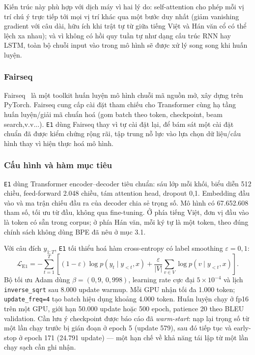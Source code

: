 Kiến trúc này phù hợp với dịch máy vì hai lý do: self-attention cho phép mỗi vị trí chú
ý trực tiếp tới mọi vị trí khác qua một bước duy nhất (giảm vanishing gradient với câu
dài, hữu ích khi trật tự từ giữa tiếng Việt và Hán văn cổ có thể lệch xa nhau); và vì
không có hồi quy tuần tự như dạng cấu trúc RNN hay LSTM, toàn bộ chuỗi input vào trong mô hình sẽ được xử lý song song khi huấn luyện.

\subsubsection{Fairseq}

Fairseq~\cite{ott2019fairseq} là một toolkit huấn luyện mô hình chuỗi mã nguồn mở, xây
dựng trên PyTorch. Fairseq cung cấp cài đặt tham chiếu cho Transformer cùng hạ tầng huấn
luyện/giải mã chuẩn hoá (gom batch theo token, checkpoint, beam search,v.v...). \texttt{E1}
dùng Fairseq thay vì tự cài đặt lại, để bám sát một cài đặt chuẩn đã được kiểm chứng rộng
rãi, tập trung nỗ lực vào lựa chọn dữ liệu/cấu hình thay vì hiện thực hoá mô hình.

\subsubsection{Cấu hình và hàm mục tiêu}

\texttt{E1} dùng Transformer encoder--decoder tiêu chuẩn: sáu lớp mỗi khối, biểu diễn
512 chiều, feed-forward 2.048 chiều, tám attention head, dropout 0,1. Embedding đầu vào
và ma trận chiếu đầu ra của decoder chia sẻ trọng số. Mô hình có 67.652.608 tham số, tối
ưu từ đầu, không qua fine-tuning. Ở phía tiếng Việt, đơn vị đầu vào là token có sẵn trong
corpus; ở phía Hán văn, mỗi ký tự là một token, theo đúng chính sách không dùng BPE đã
nêu ở mục 3.1.

Với câu đích $y_{1:T}$, \texttt{E1} tối thiểu hoá hàm cross-entropy có label smoothing
$\varepsilon=0{,}1$:
\begin{equation}
  \mathcal{L}_{\mathrm{E1}}
  = -\sum_{t=1}^{T}\left[(1-\varepsilon)\log p(y_t\mid y_{<t},x)
  + \frac{\varepsilon}{|V|}\sum_{v\in V}\log p(v\mid y_{<t},x)\right].
  \label{eq:e1-loss}
\end{equation}
Bộ tối ưu Adam dùng $\beta=(0{,}9,\,0{,}998)$, learning rate cực đại $5\times10^{-4}$ và
lịch \texttt{inverse\_sqrt} sau 8.000 update warmup. Mỗi GPU nhận tối đa 1.000 token;
\texttt{update\_freq=4} tạo batch hiệu dụng khoảng 4.000 token. Huấn luyện chạy ở fp16
trên một GPU, giới hạn 50.000 update hoặc 500 epoch, patience 20 theo BLEU validation.
Cần lưu ý checkpoint được báo cáo đã \textit{warm-start}: nạp lại trọng số từ một lần
chạy trước bị gián đoạn ở epoch 5 (update 579), sau đó tiếp tục và early-stop ở epoch
171 (24.791 update) — một hạn chế về khả năng tái lập từ một lần chạy sạch cần ghi nhận.

